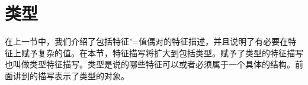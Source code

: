 \section{类型}
\label{sec-formalismus-typen}

在上一节中，我们介绍了包括特征"=值偶对的特征描述，并且说明了有必要在特征上赋予复杂的值。在本节，特征描写将扩大到包括类型。赋予了类型的特征描写也叫做类型特征描写。类型是说的哪些特征可以或者必须属于一个具体的结构。前面讲到的描写表示了类型的对象。
\ea
{}
\z

